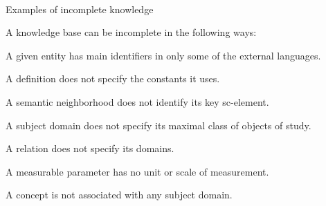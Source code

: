 \begin{frame}{\\Examples of incomplete knowledge}
	\topline
	\justifying
	\vspace{7mm}

	A knowledge base can be incomplete in the following ways:
	\begin{textitemize}
		\item A given entity has main identifiers in only some of the external languages.
		\item A definition does not specify the constants it uses.
		\item A semantic neighborhood does not identify its key sc-element.
		\item A subject domain does not specify its maximal class of objects of study.
		\item A relation does not specify its domains.
		\item A measurable parameter has no unit or scale of measurement.
		\item A concept is not associated with any subject domain.
	\end{textitemize}
\end{frame}

